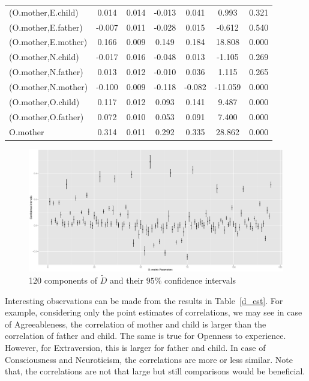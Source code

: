 \documentclass[11pt,a5paper,twoside]{book}
\begin{document}
{{\begin{center}
\begin{longtable}{@{\extracolsep{\fill}}lcccccc@{}}
   (O.mother,E.child)  & 0.014 & 0.014 & -0.013 & 0.041 & 0.993 & 0.321 \\ 
   (O.mother,E.father)  & -0.007 & 0.011 & -0.028 & 0.015 & -0.612 & 0.540 \\ 
   (O.mother,E.mother)  & 0.166 & 0.009 & 0.149 & 0.184 & 18.808 & 0.000 \\ 
   (O.mother,N.child)  & -0.017 & 0.016 & -0.048 & 0.013 & -1.105 & 0.269 \\ 
   (O.mother,N.father)  & 0.013 & 0.012 & -0.010 & 0.036 & 1.115 & 0.265 \\ 
   (O.mother,N.mother)  & -0.100 & 0.009 & -0.118 & -0.082 & -11.059 & 0.000 \\ 
   (O.mother,O.child)  & 0.117 & 0.012 & 0.093 & 0.141 & 9.487 & 0.000 \\ 
   (O.mother,O.father)  & 0.072 & 0.010 & 0.053 & 0.091 & 7.400 & 0.000 \\ 
   O.mother  & 0.314 & 0.011 & 0.292 & 0.335 & 28.862 & 0.000 \\ 
   \hline\hline
  
\end{longtable}

\end{center}
}}




\begin{figure}
\centering
\includegraphics[width=\textwidth]{d_param.eps}
\caption{120 components of $\tilde{D}$ and their $95\%$ confidence intervals} 
\label{d_ci}
\end{figure} 

Interesting observations can be made from the results in Table~\ref{d_est}. For example, considering only the point estimates of correlations, we may see in case of Agreeableness, the correlation of mother and child is larger than the correlation of father and child. The same is true for Openness to experience. However, for Extraversion, this is larger for father and child. In case of Consciousness and Neuroticism, the correlations are more or less similar. Note that, the correlations are not that large but still comparisons would be beneficial.
\end{document}
